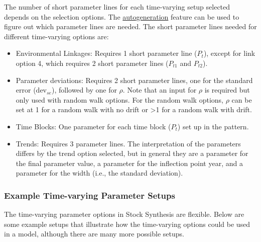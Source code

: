 The number of short parameter lines for each time-varying setup selected depends on the selection options. The \hyperlink{autogen}{autogeneration} feature can be used to figure out which parameter lines are needed. The short parameter lines needed for different time-varying options are:
\begin{itemize}
	\item Environmental Linkages: Requires 1 short parameter line ($P_{t}$), except for link option 4, which requires 2 short parameter lines ($P_{t1}$ and $P_{t2}$).
	\item Parameter deviations: Requires 2 short parameter lines, one for the standard error ($\text{dev}_{se}$), followed by one for $\rho$. Note that an input for $\rho$ is required but only used with random walk options. For the random walk options, $\rho$ can be set at 1 for a random walk with no drift or >1 for a random walk with drift.
	\item Time Blocks: One parameter for each time block ($P_{t}$) set up in the pattern.
	\item Trends: Requires 3 parameter lines. The interpretation of the parameters differs by the trend option selected, but in general they are a parameter for the final parameter value, a parameter for the inflection point year, and a parameter for the width (i.e., the standard deviation).
\end{itemize}

\subsubsection{Example Time-varying Parameter Setups}

The time-varying parameter options in Stock Synthesis are flexible. Below are some example setups that illustrate how the time-varying options could be used in a model, although there are many more possible setups.



